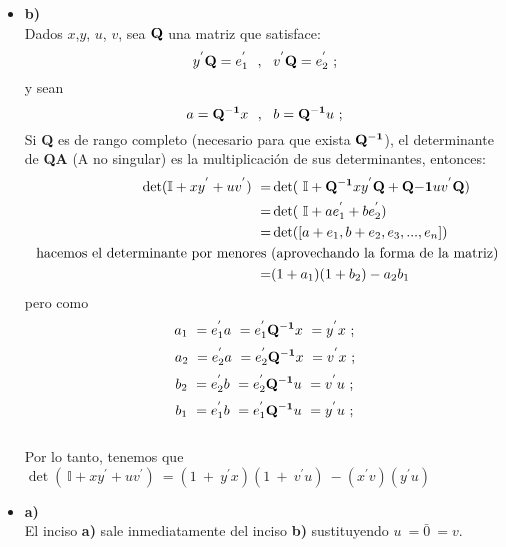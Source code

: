 \documentclass[12pt]{article}
\newcommand{\ident}{\mathbb{I}}
\newcommand{\noi}{\noindent}
\newcommand{\beas}{\begin{eqnarray*}}
\newcommand{\eeas}{\end{eqnarray*}}
\begin{document}
\begin{itemize} 
\item{\bf b)}\\
\noi Dados $x$,$y$, $u$, $v$, sea ${\bf Q}$ una matriz que satisface: 
$$y^{'}{\bf Q} = e_{1}^{'}\ \ ,\ \ v^{'}{\bf Q} = e_{2}^{'}\ ;$$
\noi y sean 
$$ a = {\bf Q^{-1}}x\ \ ,\ \ b = {\bf Q^{-1}}u\ ;$$
\noi Si {\bf Q} es de rango completo (necesario para que exista ${\bf Q^{-1}}$), el determinante de {\bf Q}{\bf A} (A no singular) es la multiplicaci\'on de sus determinantes, entonces:
\beas
\det(\ident + xy^{'} + uv^{'})\  =&\det(\ \ident + {\bf Q^{-1}}xy^{'}{\bf Q} + {\bf Q{-1}}uv^{'}{\bf Q}) \\
\ =&\det(\ \ident + ae_{1}^{'} + be_{2}^{'})\\
\ =&\det(\left[a+e_{1},b+e_{2},e_{3},...,e_{n}\right])\\
\ \text{hacemos el determinante por menores}\ & \text{(aprovechando la forma de la matriz)}\\
\ =& (1+a_{1})(1+b_{2})-a_{2}b_{1}
\eeas
\noi pero como $$a_{1}\ = e_{1}^{'}a\ = e_{1}^{'}{\bf Q^{-1}}x\ = y^{'}x \ ;$$
$$a_{2}\ = e_{2}^{'}a\ =e_{2}^{'}{\bf Q^{-1}}x\ = v^{'}x \ ;$$
$$b_{2}\ = e_{2}^{'}b\ =e_{2}^{'}{\bf Q^{-1}}u\ = v^{'}u  \ ;$$
$$b_{1}\ = e_{1}^{'}b\ = e_{1}^{'}{\bf Q^{-1}}u\ = y^{'}u \ ;$$\\
\noi Por lo tanto, tenemos que $\det(\ \ident + xy^{'} + uv^{'})\ =( 1\ +\ y^{'}x)( 1\ +\ v^{'}u)\ -(x^{'}v)(y^{'}u) $\\

\item{\bf a)}\\
\noi El inciso {\bf a)} sale inmediatamente del inciso {\bf b)} sustituyendo $u\ = \bar{0}\ =v $.\\ \\


\end{itemize}
\end{document}
